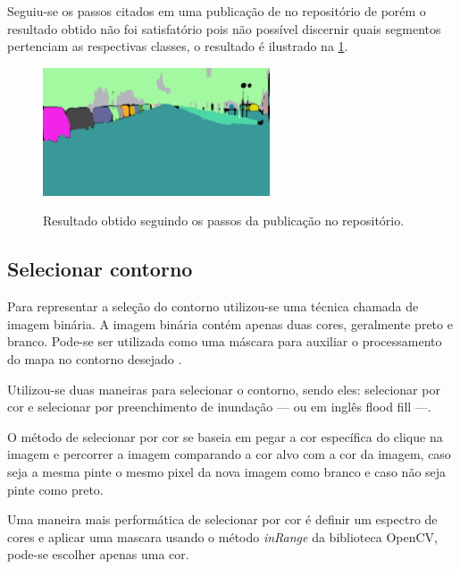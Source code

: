 Seguiu-se os passos citados em uma publicação de  no repositório de  porém o resultado obtido não foi satisfatório pois não possível discernir quais segmentos pertenciam as respectivas classes, o resultado é ilustrado na \cref{fig:resultado_obtido}.

\begin{figure}[!ht]
	\centering
    \caption{Resultado obtido seguindo os passos da publicação no repositório.}
	\includegraphics[width=0.6\textwidth]{figures/resultado_obtido.png}
	\label{fig:resultado_obtido}
\end{figure}

\subsection{Selecionar contorno}

Para representar a seleção do contorno utilizou-se uma técnica chamada de imagem binária.
A imagem  binária contém  apenas duas cores, geralmente preto e  branco. Pode-se ser utilizada como uma máscara para auxiliar o processamento do  mapa no contorno desejado \cite{Aznag2020}.

Utilizou-se duas maneiras para selecionar o contorno, sendo eles: selecionar por cor e selecionar por preenchimento de inundação — ou  em inglês  flood fill —.


O método de selecionar por cor se baseia em pegar a cor específica do clique na imagem e percorrer a imagem comparando a cor alvo com a cor da imagem, caso seja a mesma pinte o mesmo pixel da nova imagem como branco e caso não seja pinte como preto.

Uma maneira mais performática de selecionar por cor é definir um espectro de cores e aplicar uma mascara usando o método \textit{inRange} da biblioteca OpenCV, pode-se escolher apenas uma cor.


